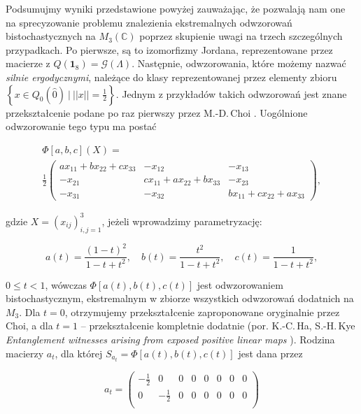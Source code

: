 {\label{com:onlyOneExample}
Podsumujmy wyniki przedstawione powyżej zauważając, że pozwalają nam one
na sprecyzowanie problemu znalezienia ekstremalnych odwzorowań bistochastycznych
na $M_{3}(\mathbb{C})$ poprzez skupienie uwagi na trzech szczególnych
przypadkach.
Po pierwsze, są to izomorfizmy Jordana, reprezentowane przez macierze z
$Q(\mathbf{1}_{8}) = \mathcal{G}(\Lambda)$.
Następnie, odwzorowania, które możemy nazwać \emph{silnie ergodycznymi},
należące do klasy reprezentowanej przez elementy zbioru
$\left \{ x \in Q_{0}(\hat{0}) \:|\: ||x|| = \frac{1}{2} \right \}$.
Jednym z przykładów takich odwzorowań jest znane przekształcenie podane
po raz pierwszy przez M.-D.\,Choi \cite{choi1977extremal}.
Uogólnione odwzorowanie tego typu ma postać
\begin{linenomath*}
 \begin{multline}\label{eq:choi}
\Phi[a,b,c](X)=\\
\frac{1}{2}
\begin{pmatrix}
ax_{11}+bx_{22}+cx_{33} & -x_{12} & -x_{13} \\
-x_{21} & cx_{11}+ax_{22}+bx_{33} & -x_{23} \\
-x_{31} & -x_{32} & bx_{11}+cx_{22}+ax_{33}
\end{pmatrix},
 \end{multline}
\end{linenomath*}
gdzie $X = (x_{ij})_{i,j = 1}^{3}$,
jeżeli wprowadzimy parametryzację:
\begin{linenomath*}
 \begin{equation}
 a(t)=\dfrac{(1-t)^2}{1-t+t^2},\quad b(t)=\dfrac{t^2}{1-t+t^2},\quad c(t)=\dfrac 1{1-t+t^2},
 \end{equation}
\end{linenomath*}
$0 \leq t < 1$,
wówczas $\Phi[a(t), b(t), c(t)]$ jest odwzorowaniem bistochastycznym, ekstremalnym
w zbiorze wszystkich odwzorowań dodatnich na $M_{3}$.
Dla $t = 0$, otrzymujemy przekształcenie zaproponowane oryginalnie przez Choi,
a dla $t = 1$ -- przekształcenie kompletnie dodatnie
(por.
K.-C.\,Ha, S.-H.\,Kye \emph{Entanglement witnesses arising from exposed positive linear maps}
\cite{ha2011entanglement}).
Rodzina macierzy $a_{t}$, dla której
$S_{a_{t}} = \Phi[a(t), b(t), c(t)]$ jest dana przez
\begin{linenomath*}
 \begin{equation}
 a_{t} = \begin{pmatrix}
     - \frac{1}{2} & 0 & 0 & 0 & 0 & 0 & 0 & 0 \\
     0 & - \frac{1}{2} & 0 & 0 & 0 & 0 & 0 & 0 \\

\end{pmatrix}
\end{equation}
\end{linenomath*}}

